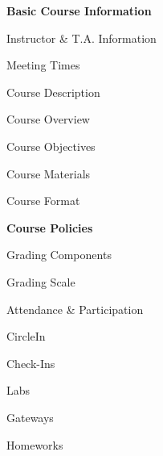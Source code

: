 \documentclass[11pt,letterpaper]{article}
\begin{document}
\mytitle


\begin{minipage}[t]{0.45\textwidth} %
{\bfseries\color{scred} Basic Course Information} \dotfill \pageref{course_info} \par
\hspace{0.3cm} Instructor \& T.A. Information \dotfill \pageref{instr_info} \par
\hspace{0.3cm} Meeting Times \dotfill \pageref{meetings} \par
\hspace{0.3cm} Course Description \dotfill \pageref{course_desc} \par
\hspace{0.3cm} Course Overview \dotfill \pageref{course_overview} \par
\hspace{0.3cm} Course Objectives \dotfill \pageref{course_obj} \par
\hspace{0.3cm} Course Materials \dotfill \pageref{course_mat} \par
\hspace{0.3cm} Course Format \dotfill \pageref{course_format} \par
{\bfseries\color{scred} Course Policies} \dotfill \pageref{course_policies} \par
\hspace{0.3cm} Grading Components \dotfill \pageref{grade_comp} \par
\hspace{0.3cm} Grading Scale \dotfill \pageref{grade_scale} \par
\hspace{0.3cm} Attendance \& Participation \dotfill \pageref{attend} \par
\hspace{0.3cm} CircleIn \dotfill \pageref{circlein} \par
\hspace{0.3cm} Check-Ins \dotfill \pageref{check} \par
\hspace{0.3cm} Labs \dotfill \pageref{labs} \par
\hspace{0.3cm} Gateways \dotfill \pageref{gateways} \par
\hspace{0.3cm} Homeworks \dotfill \pageref{hw} \par

\end{minipage}
\end{document}

